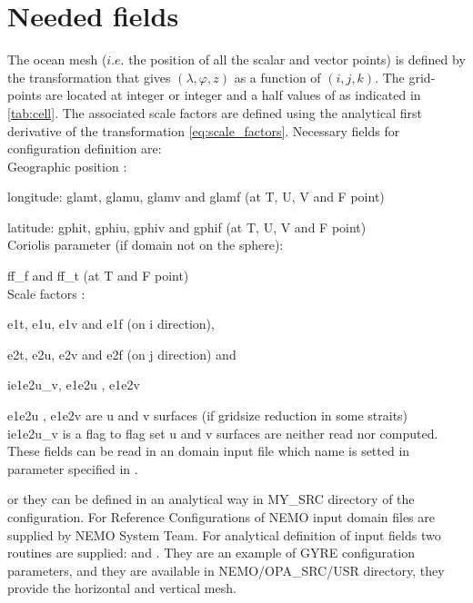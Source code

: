 \documentclass[../tex_main/NEMO_manual]{subfiles}
\begin{document}
\section{Needed fields}
\label{sec:DOM_fields}
The ocean mesh ($i.e.$ the position of all the scalar and vector points) is defined by the transformation that gives $(\lambda,\varphi,z)$ as a function of $(i,j,k)$.
The grid-points are located at integer or integer and a half values of as indicated in \autoref{tab:cell}.
The associated scale factors are defined using the analytical first derivative of the transformation
\autoref{eq:scale_factors}.
Necessary fields for configuration definition are: \\
Geographic position :

longitude: glamt, glamu, glamv and glamf (at T, U, V and F point)

latitude: gphit, gphiu, gphiv and gphif (at T, U, V and F point)\\
Coriolis parameter (if domain not on the sphere): 

 ff\_f  and  ff\_t (at T and F point)\\
Scale factors : 
 
 e1t, e1u, e1v and e1f (on i direction),

 e2t, e2u, e2v and e2f (on j direction) and

 ie1e2u\_v, e1e2u , e1e2v   
 
e1e2u , e1e2v are u and v surfaces (if gridsize reduction in some straits)\\
ie1e2u\_v is a flag to flag set u and  v surfaces are neither read nor computed.\\
 
These fields can be read in an domain input file which name is setted in
 parameter specified in .

or they can be defined in an analytical way in MY\_SRC directory of the configuration.
For Reference Configurations of NEMO input domain files are supplied by NEMO System Team.
For analytical definition of input fields two routines are supplied:  and .
They are an example of GYRE configuration parameters, and they are available in NEMO/OPA\_SRC/USR directory,
they provide the horizontal and vertical mesh. 
\end{document}
